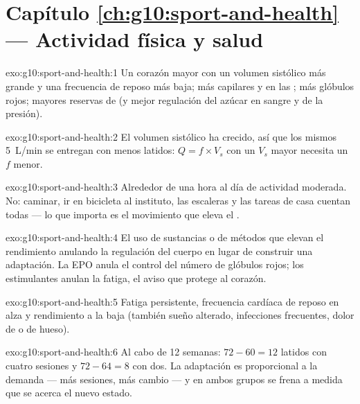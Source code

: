 \section*{Capítulo \ref{ch:g10:sport-and-health} --- Actividad física y salud}

\begin{solution}{exo:g10:sport-and-health:1}
Un corazón mayor con un volumen sistólico más grande y una frecuencia
de reposo más baja; más capilares y  en las ; más glóbulos rojos; mayores reservas de  (y mejor
regulación del azúcar en sangre y de la presión).
\end{solution}

\begin{solution}{exo:g10:sport-and-health:2}
El volumen sistólico ha crecido, así que los mismos \qty{5}{L/min} se
entregan con menos latidos: $Q = f \times V_s$ con un $V_s$ mayor
necesita un $f$ menor.
\end{solution}

\begin{solution}{exo:g10:sport-and-health:3}
Alrededor de una hora al día de actividad moderada. No: caminar, ir en
bicicleta al instituto, las escaleras y las tareas de casa cuentan
todas --- lo que importa es el movimiento que eleva el .
\end{solution}

\begin{solution}{exo:g10:sport-and-health:4}
El uso de sustancias o de métodos que elevan el rendimiento anulando la
regulación del cuerpo en lugar de construir una adaptación. La EPO
anula el control del número de glóbulos rojos; los estimulantes anulan
la fatiga, el aviso que protege al corazón.
\end{solution}

\begin{solution}{exo:g10:sport-and-health:5}
Fatiga persistente, frecuencia cardíaca de reposo en alza y
rendimiento a la baja (también sueño alterado, infecciones frecuentes,
dolor de  o de hueso).
\end{solution}

\begin{solution}{exo:g10:sport-and-health:6}
Al cabo de 12 semanas: $72 - 60 = 12$ latidos con cuatro sesiones y
$72 - 64 = 8$ con dos. La adaptación es proporcional a la demanda ---
más sesiones, más cambio --- y en ambos grupos se frena a medida que se
acerca el nuevo estado.
\end{solution}

